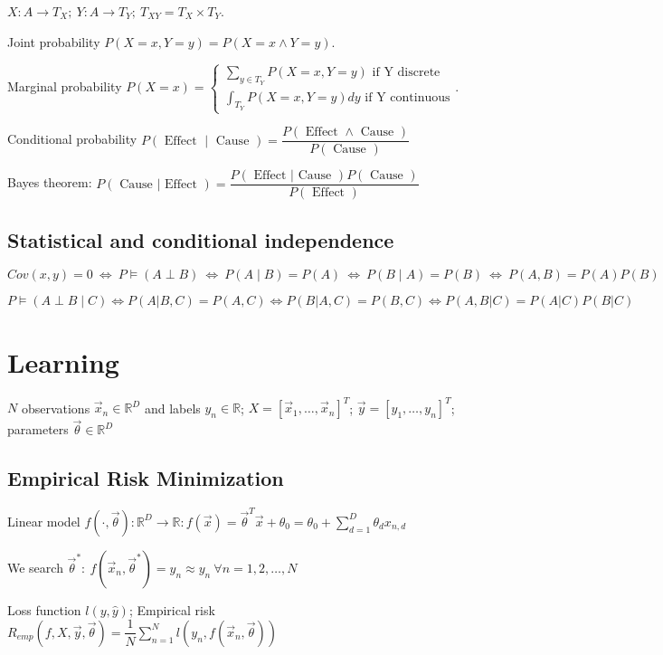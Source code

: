 \documentclass[]{article}
\begin{document}
	$X:A\to T_X; \ Y:A\to T_Y; \ T_{XY}=T_X \times T_Y$.
	
	Joint probability $P(X=x,Y=y) = P(X=x \land Y=y)$.
	
	Marginal probability $P(X=x)=\left\{\begin{matrix}
		\sum_{y\in T_Y} P(X=x,Y=y) \text{ if Y discrete}\\
		\int_{T_Y} P(X=x,Y=y) dy \text{ if Y continuous}
	\end{matrix}\right.$.
	
	Conditional probability $P(\text { Effect } \mid \text { Cause })=\dfrac{P(\text { Effect } \wedge \text { Cause })}{P(\text { Cause })}$
	
	Bayes theorem: $P(\text { Cause } | \text { Effect })=\dfrac{P(\text { Effect } | \text { Cause }) P( \text{ Cause })}{P(\text { Effect })}$
	
	\subsection{Statistical and conditional independence}
	
	$Cov(x,y)=0 \ \Leftrightarrow \ P \models (A \perp B) \ \Leftrightarrow \ P(A \mid B)=P(A) \ \Leftrightarrow \ P(B \mid A)=P(B) \ \Leftrightarrow \ P(A,B)=P(A)P(B)$
	
	$P \models (A \perp B \mid C) \Leftrightarrow P(A|B,C) = P(A,C) \Leftrightarrow P(B|A,C) = P(B,C) \Leftrightarrow P(A,B|C) = P(A|C)P(B|C)$
	
	\section{Learning}
	
	$N$ observations $\vec{x}_n\in\mathbb{R}^D$ and labels $y_n\in\mathbb{R}$; $X=[\vec{x}_1,\dots,\vec{x}_n]^T$; $\vec{y}=[y_1,\dots,y_n]^T$; parameters $\vec{\theta}\in\mathbb{R}^{D}$
	
	\subsection{Empirical Risk Minimization}
	
	Linear model $f(\cdot,\vec{\theta}):\mathbb{R}^D\to\mathbb{R}:f(\vec{x})=\vec{\theta}^T \vec{x} + \theta_0 = \theta_0 + \sum\limits_{d=1}^D \theta_d x_{n,d}$
	
	We search $\vec{\theta}^* : \ f(\vec{x}_n, \vec{\theta}^*) = \hat{y}_n \approx y_n \ \forall n=1,2,\dots,N$
	
	Loss function $l(y, \hat{y})$; Empirical risk $R_{emp}(f,X,\vec{y},\vec{\theta})=\dfrac{1}{N}\sum\limits_{n=1}^N l(y_n,f(\vec{x}_n,\vec{\theta}))$
	
\end{document}
